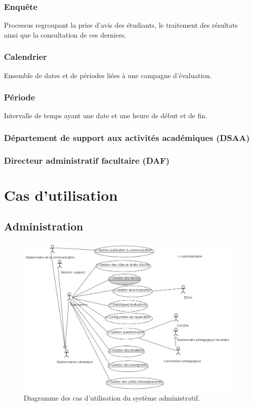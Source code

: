 \documentclass[a4paper,11pt]{report}
\begin{document}
\subsection{Enquête}
Processus regroupant la prise d'avis des étudiants, le traitement des résultats ainsi que la consultation de ces derniers.

\subsection{Calendrier}
Ensemble de dates et de périodes liées à une campagne d'évaluation.

\subsection{Période}
Intervalle de temps ayant une date et une heure de début et de fin.

\subsection{Département de support aux activités académiques (DSAA)}

\subsection{Directeur administratif facultaire (DAF)}














\chapter{Cas d'utilisation}

\section{Administration}

\begin{figure}[ht]
\includegraphics[width=\linewidth]{workspace/evalens-usecases/administration.png}
\caption{Diagramme des cas d'utilisation du système administratif.}
\label{fig:usecase-admin}
\end{figure}
\end{document}
